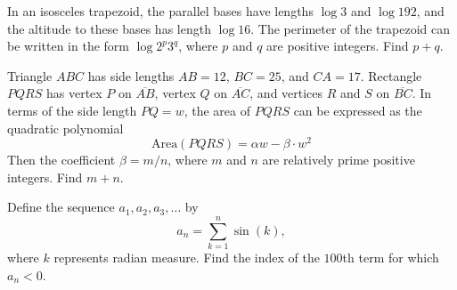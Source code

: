 \documentclass[11pt]{article}
\theoremstyle{definition}
\begin{document}
\begin{question}[name={2015 AIME II, \href{https://artofproblemsolving.com/community/c4p4652169}{Problem 4}}]
	In an isosceles trapezoid, the parallel bases have lengths $\log3$ and $\log192$, and the altitude to these bases has length $\log16$. The perimeter of the trapezoid can be written in the form $\log2^p3^q$, where $p$ and $q$ are positive integers. Find $p+q$.	
	
\end{question}


%	







\begin{question}[name={2015 AIME II, \href{https://artofproblemsolving.com/community/c4p4652185}{Problem 7}}]
	Triangle $ABC$ has side lengths $AB=12$, $BC=25$, and $CA=17$. Rectangle $PQRS$ has vertex $P$ on $\overline{AB}$, vertex $Q$ on $\overline{AC}$, and vertices $R$ and $S$ on $\overline{BC}$. In terms of the side length $PQ=w$, the area of $PQRS$ can be expressed as the quadratic polynomial
	\[\text{Area}(PQRS)=\alpha w-\beta\cdot w^2\]
	Then the coefficient $\beta={m}/{n}$, where $m$ and $n$ are relatively prime positive integers. Find $m+n$.
\end{question}


%	













\begin{question}[name={2015 AIME II, \href{https://artofproblemsolving.com/community/c4p4652224}{Problem 13}}]
	Define the sequence $a_1,a_2,a_3,\ldots$ by $$a_n=\sum_{k=1}^n\sin(k),$$ where $k$ represents radian measure. Find the index of the $100$th term for which $a_n<0$.
\end{question}


%	
\end{document}
